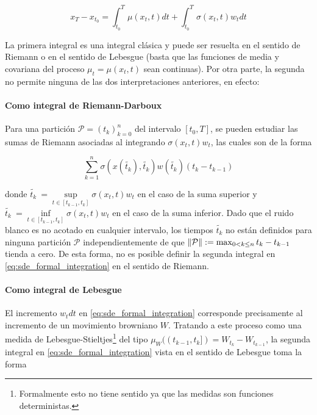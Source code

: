 \begin{equation}
    x_T - x_{t_0} = \int_{t_0}^T \mu(x_t,t)dt + \int_{t_0}^T \sigma(x_t,t)w_t dt
    \label{eq:sde_formal_integration}
\end{equation}

La primera integral es una integral clásica y puede ser resuelta en el sentido de Riemann o en el sentido de Lebesgue (basta que las funciones de media y covariana del proceso $\mu_t=\mu(x_t,t)$ sean continuas). Por otra parte, la segunda no permite ninguna de las dos interpretaciones anteriores, en efecto:

\paragraph{Como integral de Riemann-Darboux}
Para una partición $\mathcal{P}=(t_k)_{k=0}^n$ del intervalo $[t_0, T]$, se pueden estudiar las sumas de Riemann asociadas al integrando $\sigma(x_t,t)w_t$, las cuales son de la forma

\begin{equation}
    \sum_{k=1}^n \sigma\left(x(\tilde{t_k}),\tilde{t_k}\right)w\left(\tilde{t_k}\right) (t_k - t_{k-1})
\end{equation}

donde $\tilde{t_k}\ = \sup\limits_{t\in [t_{k-1}, t_k]} \sigma(x_t,t)w_t$ en el caso de la suma superior y $\tilde{t_k}\ = \inf\limits_{t\in [t_{k-1}, t_k]} \sigma(x_t,t)w_t$ en el caso de la suma inferior. Dado que el ruido blanco es no acotado en cualquier intervalo, los tiempos $\tilde{t_k}$ no están definidos para ninguna partición $\mathcal{P}$ independientemente de que $\left\lVert \mathcal{P} \right\rVert := \max_{0<k\leq n} t_k - t_{k-1}$ tienda a cero. De esta forma, no es posible definir la segunda integral en \eqref{eq:sde_formal_integration} en el sentido de Riemann.

\paragraph{Como integral de Lebesgue}
El incremento $w_t dt$ en \eqref{eq:sde_formal_integration} corresponde precisamente al incremento de un movimiento browniano $W$. Tratando a este proceso como una medida de Lebesgue-Stieltjes\footnote{Formalmente esto no tiene sentido ya que las medidas son funciones deterministas.} del tipo $\mu_W((t_{k-1}, t_k]) = W_{t_k} - W_{t_{k-1}}$, la segunda integral en \eqref{eq:sde_formal_integration} vista en el sentido de Lebesgue toma la forma


